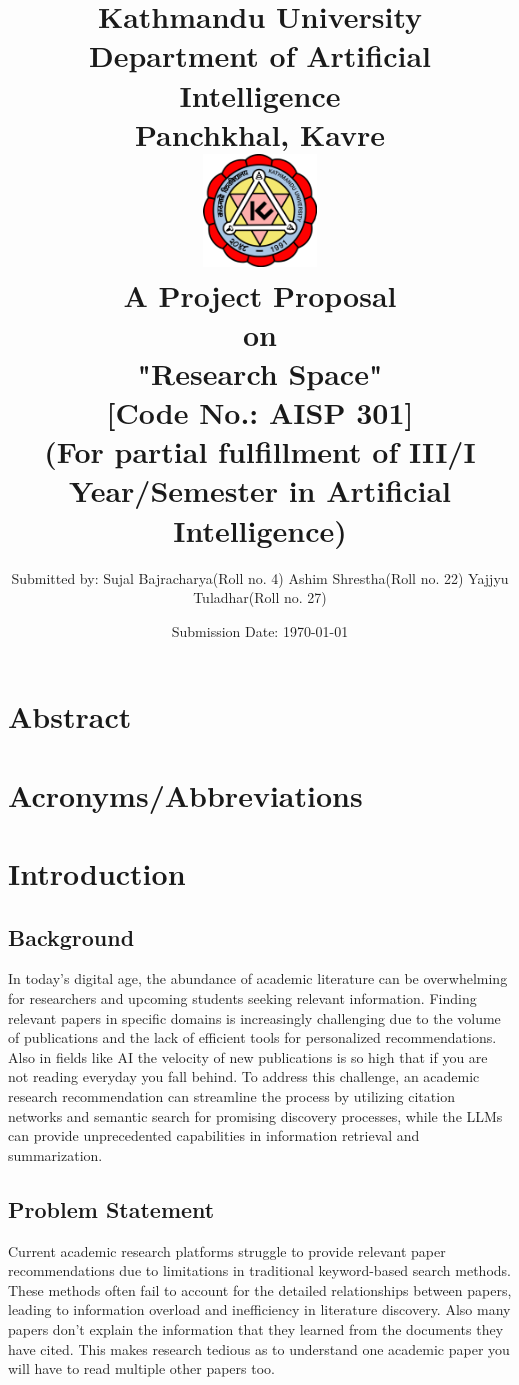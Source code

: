 \documentclass[a4paper,12pt]{article}
\title{
\textbf{
    Kathmandu University \\
    \large{Department of Artificial Intelligence}\\
    \normalsize{Panchkhal, Kavre}\\[1.5cm]}
    \includegraphics[width=3cm]{KU-Logo.png}\\[1cm]
    \normalsize{A Project Proposal\\on\\
    \textbf{"Research Space"}}\\[0.5cm]
    \normalsize{[Code No.: AISP 301]\\
    (For partial fulfillment of III/I Year/Semester in Artificial Intelligence)}\\[1cm]
}
\author[ ]{\normalsize{
        Submitted by: \linebreak
        Sujal Bajracharya(Roll no. 4)\linebreak
        Ashim Shrestha(Roll no. 22)\linebreak
        Yajjyu Tuladhar(Roll no. 27)
}}
\affil[ ]{\vspace{0.3cm}}
\affil[ ]{\normalsize{
        Submitted to: \linebreak
        Subodh Acharya \linebreak
        Department of Artificial Intelligence
}}
\date{\normalsize{Submission Date: \today}}
\begin{document}
\maketitle
\thispagestyle{empty}
\restoregeometry

\newpage
\setcounter{page}{1}

\section*{Abstract}
\newpage

\tableofcontents
\newpage

\listoffigures
\newpage

\section*{Acronyms/Abbreviations}
\newpage

\setcounter{page}{1}

\section{Introduction}
\subsection{Background}
In today's digital age, the abundance of academic literature can be overwhelming
for researchers and upcoming students seeking relevant information. Finding relevant
papers in specific domains is increasingly challenging due to the volume of
publications and the lack of efficient tools for personalized recommendations. Also
in fields like AI the velocity of new publications is so high that if you are not
reading everyday you fall behind. To address this challenge, an academic research
recommendation can streamline the process by utilizing citation networks and
semantic search for promising discovery processes, while the LLMs can provide
unprecedented capabilities in information retrieval and summarization.

\subsection{Problem Statement}
Current academic research platforms struggle to provide relevant paper
recommendations due to limitations in traditional keyword-based search methods.
These methods often fail to account for the detailed relationships between papers,
leading to information overload and inefficiency in literature discovery. Also many
papers don't explain the information that they learned from the documents they
have cited. This makes research tedious as to understand one academic paper you
will have to read multiple other papers too.
\end{document}
